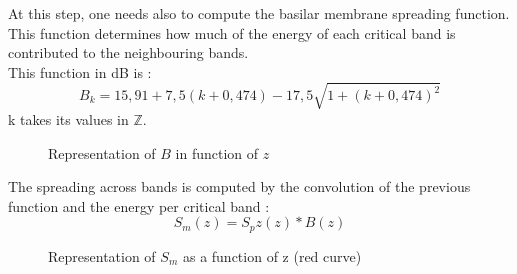 At this step, one needs also to compute the basilar membrane spreading function. This function determines how much of the energy of each 
critical band is contributed to the neighbouring bands.\\
This function in dB is :
$$B_k = 15,91+7,5(k + 0,474) - 17,5\sqrt{1 + (k + 0,474)^2}$$
k takes its values in $\mathbb{Z}$.
\begin{figure}[H]
\caption{Representation of $B$ in function of $z$}
\end{figure}
The spreading across bands is computed by the convolution of the previous function and the energy per critical band :
$$S_m(z) = S_pz(z)*B(z)$$
\begin{figure}[H]
\caption{Representation of $S_m$ as a function of z (red curve)}
\end{figure}

